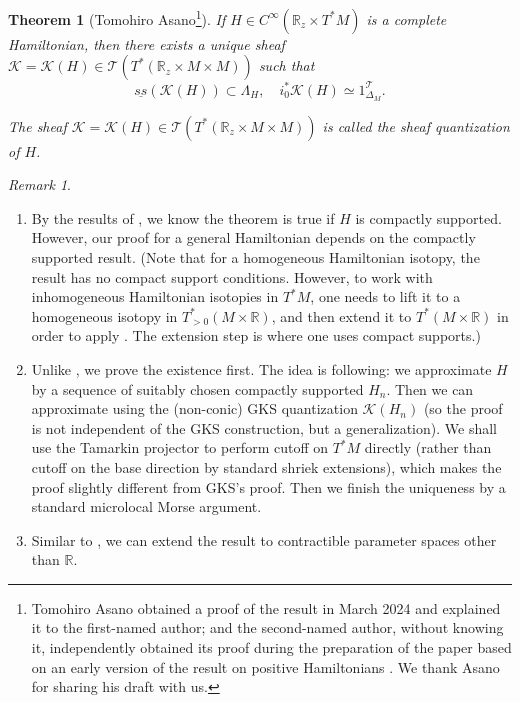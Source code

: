 \documentclass[11pt]{amsart}
\numberwithin{equation}{section}
\theoremstyle{plain}
\newtheorem{Thm}{Theorem}[section]
\theoremstyle{definition}
\theoremstyle{remark}
\newtheorem{RMK}[rmk]{Remark}
\newcommand{\bR} { {\mathbb{R}}}
\newcommand{\cK} { {\mathcal{K}}}
\newcommand{\sT} { {\mathscr{T}}}
\begin{document}
\begin{Thm}[Tomohiro Asano\footnote{
Tomohiro Asano obtained a proof of the result in March 2024 and explained it to the first-named author; and the second-named author, without knowing it, independently obtained its proof during the preparation of the paper based on an early version of the result on positive Hamiltonians \cite{Asano-Ike-peg}. We thank Asano for sharing his draft with us.
}]\label{thm: existence of sheafquantization for all complete hamiltonian}If $H\in C^\infty(\bR_z\times T^*M)$ is a complete Hamiltonian, then there exists a unique sheaf $\cK = \cK(H) \in \sT(T^*(\bR_z\times M\times M))$ such that 
\[\underline{ss}(\cK(H))\subset \Lambda_H,\quad i_0^*\cK(H)\simeq 1_{\Delta_{M}}^\sT.\]   

The sheaf $\cK=\cK(H)\in \sT(T^*(\bR_z\times M\times M))$ is called the \textit{sheaf quantization} of $H$.
\end{Thm}
\begin{RMK}\begin{enumerate}[fullwidth]
\item By the results of \cite{GKS2012}, we know the theorem is true if $H$ is compactly supported. However, our proof for a general Hamiltonian depends on the compactly supported result. (Note that for a homogeneous Hamiltonian isotopy, the result \cite{GKS2012} has no compact support conditions. However, to work with inhomogeneous Hamiltonian isotopies in $T^*M$, one needs to lift it to a homogeneous isotopy in $T^*_{>0}(M \times \bR)$, and then extend it to $T^*(M \times \bR)$ in order to apply \cite{GKS2012}. The extension step is where one uses compact supports.)
\item Unlike \cite{GKS2012}, we prove the existence first. The idea is following: we approximate $H$ by a sequence of suitably chosen compactly supported $H_n$. Then we can approximate using the (non-conic) GKS quantization $\cK({H_n})$ (so the proof is not independent of the GKS construction, but a generalization). We shall use the Tamarkin projector to perform cutoff on $T^*M$ directly (rather than cutoff on the base direction by standard shriek extensions), which makes the proof slightly different from GKS's proof. 
Then we finish the uniqueness by a standard microlocal Morse argument.

\item Similar to \cite[Remark 3.9]{GKS2012}, we can extend the result to contractible parameter spaces other than $\bR$.
\end{enumerate}
    
\end{RMK}
\end{document}
